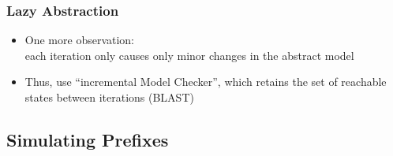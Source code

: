 \begin{frame}
\frametitle{Lazy Abstraction}

\begin{itemize}
\item One more observation:\\
each iteration only
{\color{ta3chameleon}causes only minor changes} in the abstract model
\vfill

\item Thus, use ``incremental Model Checker'', which
{\color{ta3skyblue}retains
the set of reachable states between iterations} (BLAST)

\end{itemize}

\end{frame}


\subsection{Simulating Prefixes}


\newlength{\vvdist}
\setlength{\vvdist}{.6cm}

